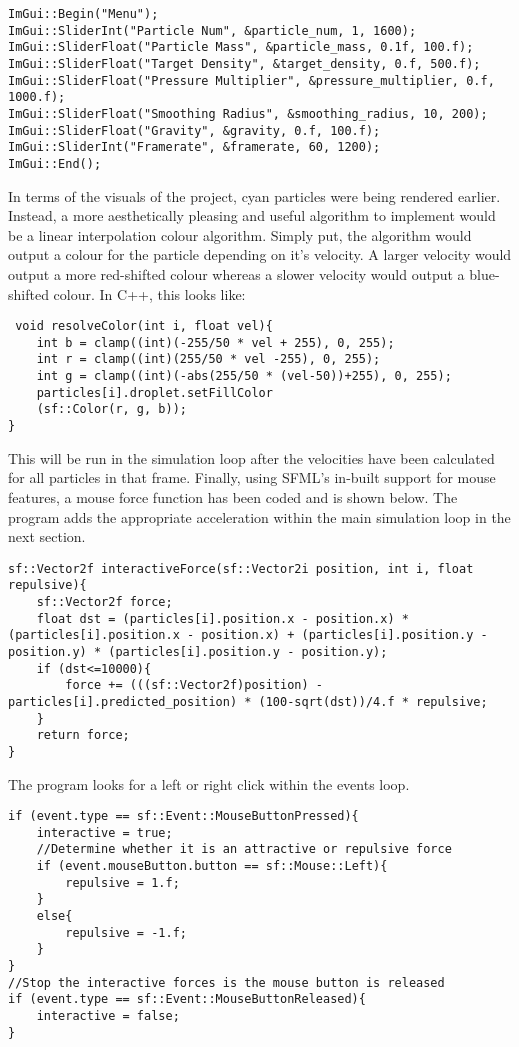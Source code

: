 \documentclass[write-up.tex]{subfiles}
\begin{document}
\begin{lstlisting}
ImGui::Begin("Menu");
ImGui::SliderInt("Particle Num", &particle_num, 1, 1600);
ImGui::SliderFloat("Particle Mass", &particle_mass, 0.1f, 100.f);
ImGui::SliderFloat("Target Density", &target_density, 0.f, 500.f);
ImGui::SliderFloat("Pressure Multiplier", &pressure_multiplier, 0.f, 1000.f);
ImGui::SliderFloat("Smoothing Radius", &smoothing_radius, 10, 200);
ImGui::SliderFloat("Gravity", &gravity, 0.f, 100.f);
ImGui::SliderInt("Framerate", &framerate, 60, 1200);
ImGui::End();
\end{lstlisting}

In terms of the visuals of the project, cyan particles were being rendered earlier. Instead, a more aesthetically pleasing and useful algorithm to implement would be a linear interpolation colour algorithm. Simply put, the algorithm would output a colour for the particle depending on it's velocity. A larger velocity would output a more red-shifted colour whereas a slower velocity would output a blue-shifted colour. In C++, this looks like:

\begin{lstlisting}
 void resolveColor(int i, float vel){
    int b = clamp((int)(-255/50 * vel + 255), 0, 255);
    int r = clamp((int)(255/50 * vel -255), 0, 255);
    int g = clamp((int)(-abs(255/50 * (vel-50))+255), 0, 255);
    particles[i].droplet.setFillColor
    (sf::Color(r, g, b));
}
\end{lstlisting}
This will be run in the simulation loop after the velocities have been calculated for all particles in that frame. Finally, using SFML's in-built support for mouse features, a mouse force function has been coded and is shown below. The program adds the appropriate acceleration within the main simulation loop in the next section.

\begin{lstlisting}
sf::Vector2f interactiveForce(sf::Vector2i position, int i, float repulsive){
    sf::Vector2f force;
    float dst = (particles[i].position.x - position.x) * (particles[i].position.x - position.x) + (particles[i].position.y - position.y) * (particles[i].position.y - position.y);
    if (dst<=10000){
        force += (((sf::Vector2f)position) - particles[i].predicted_position) * (100-sqrt(dst))/4.f * repulsive;
    }
    return force;
}
\end{lstlisting}
The program looks for a left or right click within the events loop.
\begin{lstlisting}
if (event.type == sf::Event::MouseButtonPressed){
    interactive = true;
    //Determine whether it is an attractive or repulsive force
    if (event.mouseButton.button == sf::Mouse::Left){
        repulsive = 1.f;
    }
    else{
        repulsive = -1.f;
    }
}
//Stop the interactive forces is the mouse button is released
if (event.type == sf::Event::MouseButtonReleased){
    interactive = false;
}
\end{lstlisting}
\end{document}
